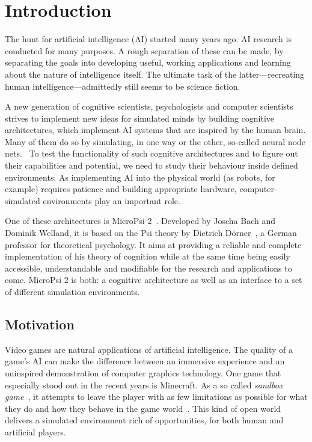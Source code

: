 \chapter{Introduction}
\label{chap:1}

The hunt for artificial intelligence (AI) started many years ago. AI research is conducted for many purposes. A rough separation of these can be made, by separating the goals into developing useful, working applications and learning about the nature of intelligence itself. The ultimate task of the latter---recreating human intelligence---admittedly still seems to be science fiction.

A new generation of cognitive scientists, psychologists and computer scientists strives to implement new ideas for simulated minds by building cognitive architectures, which implement AI systems that are inspired by the human brain. Many of them do so by simulating, in one way or the other, so-called neural node nets.~\cite{Goertzel201030} To test the functionality of such cognitive architectures and to figure out their capabilities and potential, we need to study their behaviour inside defined environments. As implementing AI into the physical world (as robots, for example) requires patience and building appropriate hardware, computer-simulated environments play an important role.

One of these architectures is MicroPsi 2~\cite{conf/agi/Bach12}. Developed by Joscha Bach and Dominik Welland, it is based on the Psi theory by Dietrich Dörner~\cite{Doerner1998}, a German professor for theoretical psychology. It aims at providing a reliable and complete implementation of his theory of cognition while at the same time being easily accessible, understandable and modifiable for the research and applications to come. MicroPsi 2 is both: a cognitive architecture as well as an interface to a set of different simulation environments.

\section{Motivation}

Video games are natural applications of artificial intelligence. The quality of a game's AI can make the difference between an immersive experience and an uninspired demonstration of computer graphics technology. One game that especially stood out in the recent years is Minecraft. As a so called \emph{sandbox game}~\cite{Duncan:2011:MBC:2207096.2207097}, it attempts to leave the player with as few limitations as possible for what they do and how they behave in the game world~\cite{doi:10.1162/dmal.9780262693646.167}. This kind of open world delivers a simulated environment rich of opportunities, for both human and artificial players. 


